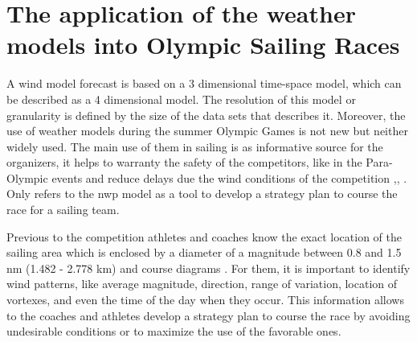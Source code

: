 



\section{The application of the weather models into Olympic Sailing Races}

A wind model forecast is based on a 3 dimensional time-space model, which can be described as a 4 dimensional model. The resolution of this model or granularity is defined by the size of the data sets that describes it. Moreover, the use of weather models during the summer Olympic Games is not new but neither widely used. The main use of them in sailing is as informative source for the organizers, it helps to warranty the safety of the competitors, like in the Para-Olympic events and reduce delays due the wind conditions of the competition  \cite{spark2004wind},\cite{sheng2009structure}, \cite{golding2014forecasting}. Only \cite{giannaros2018ultrahigh} %
refers to the \acrshort{nwp} model as a tool to develop a strategy plan to course the race for a sailing team. \par 

Previous to the competition athletes and coaches know the exact location of the sailing area which is enclosed by a diameter of a magnitude between 0.8 and 1.5 nm (1.482 - 2.778 km) and course diagrams \cite{SailRaceRio}. For them, it is important to identify wind patterns, like average magnitude, direction, range of variation, location of vortexes, and even the time of the day when they occur. This information allows to the coaches and athletes develop a strategy plan to course the race by avoiding undesirable conditions or to maximize the use of the favorable ones.\par

